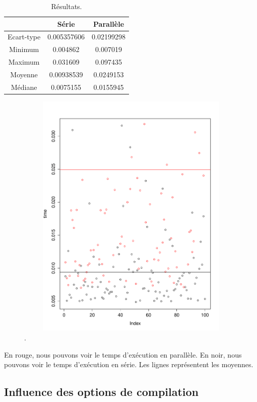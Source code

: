 \begin{table}[h!]
	\centering
	\caption{Résultats.}
	\label{tab:resultatTemps}
	\begin{tabular}{c|cc}
		\toprule
		& Série & Parallèle\\
		\midrule
		Ecart-type & 0.005357606 & 0.02199298\\
		Minimum & 0.004862 & 0.007019\\
		Maximum & 0.031609 & 0.097435\\
		Moyenne & 0.00938539 & 0.0249153\\
		Médiane & 0.0075155 & 0.0155945\\
		\bottomrule
	\end{tabular}
\end{table}

\begin{figure}[htbp]
	\begin{center}
		\includegraphics[width=12cm,height=12cm]{diagrams/time_serial_paral.pdf}
		\caption{.}
		\label{fig:timeSerialParal}
	\end{center}
\end{figure}
En rouge, nous pouvons voir le temps d'exécution en parallèle.
En noir, nous pouvons voir le temps d'exécution en série.
Les lignes représentent les moyennes.


\subsection{Influence des options de compilation}

